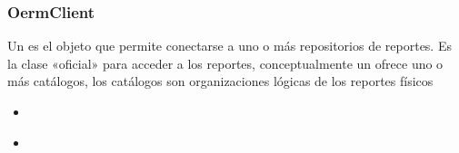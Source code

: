 \documentclass[a4paper,12pt,spanish]{sphinxmanual}
\begin{document}
\subsubsection{OermClient}
\label{\detokenize{openerm.OermClient:id1}}\label{\detokenize{openerm.OermClient::doc}}
Un  es el objeto que permite conectarse a uno o más repositorios
de reportes. Es la clase «oficial» para acceder a los reportes, conceptualmente
un  ofrece uno o más catálogos, los catálogos son organizaciones
lógicas de los reportes físicos



\begin{itemize}
\item {} 
{\hyperref[\detokenize{openerm.MetadataContainer:module-openerm.MetadataContainer}]{}}

\item {} 
{\hyperref[\detokenize{openerm.PageContainer:module-openerm.PageContainer}]{}}

\end{itemize}


\end{document}
